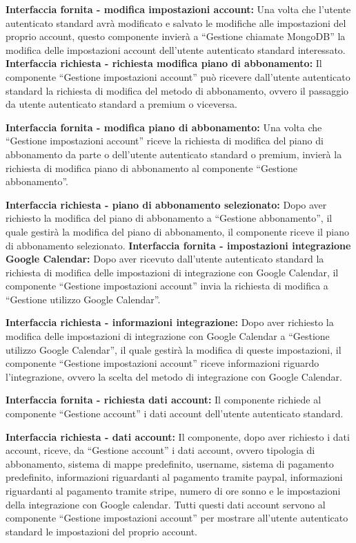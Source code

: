 \begin{listaPersonale}[]{}
    \textbf{Interfaccia fornita - modifica impostazioni account:} Una volta che l'utente autenticato standard avrà modificato e salvato le modifiche alle impostazioni del proprio account, questo componente invierà a “Gestione chiamate MongoDB” la modifica delle impostazioni account dell'utente autenticato standard interessato.
    \textbf{Interfaccia richiesta - richiesta modifica piano di
        abbonamento:} Il componente “Gestione impostazioni account” può ricevere dall'utente autenticato standard la richiesta di modifica del metodo di abbonamento, ovvero il passaggio da utente autenticato standard a premium o viceversa.

    \textbf{Interfaccia fornita - modifica piano di abbonamento:} Una volta che “Gestione impostazioni account” riceve la richiesta di modifica del piano di abbonamento da parte o dell'utente autenticato standard o premium, invierà la richiesta di modifica piano di abbonamento al componente “Gestione abbonamento”.

    \textbf{Interfaccia richiesta - piano di abbonamento selezionato:} Dopo aver richiesto la modifica del piano di abbonamento a “Gestione abbonamento”, il quale gestirà la modifica del piano di abbonamento, il componente riceve il piano di abbonamento selezionato.
    \textbf{Interfaccia fornita - impostazioni integrazione Google
        Calendar:} Dopo aver ricevuto dall'utente autenticato standard la richiesta di modifica delle impostazioni di integrazione con Google Calendar, il componente “Gestione impostazioni account” invia la richiesta di modifica a “Gestione utilizzo Google Calendar”.

    \textbf{Interfaccia richiesta - informazioni integrazione:} Dopo aver richiesto la modifica delle impostazioni di integrazione con Google Calendar a “Gestione utilizzo Google Calendar”, il quale gestirà la modifica di queste impostazioni, il componente “Gestione impostazioni account” riceve informazioni riguardo l'integrazione, ovvero la scelta del metodo di integrazione con Google Calendar.

    \textbf{Interfaccia fornita - richiesta dati account:} Il componente richiede al componente “Gestione account” i dati account dell'utente autenticato standard.

    \textbf{Interfaccia richiesta - dati account:} Il componente, dopo aver richiesto i dati account, riceve, da “Gestione account” i dati account, ovvero tipologia di abbonamento, sistema di mappe predefinito, username, sistema di pagamento predefinito, informazioni riguardanti al pagamento tramite paypal, informazioni riguardanti al pagamento tramite stripe, numero di ore sonno e le impostazioni della integrazione con Google calendar. Tutti questi dati account servono al componente “Gestione impostazioni account” per mostrare all'utente autenticato standard le impostazioni del proprio account.



\end{listaPersonale}
